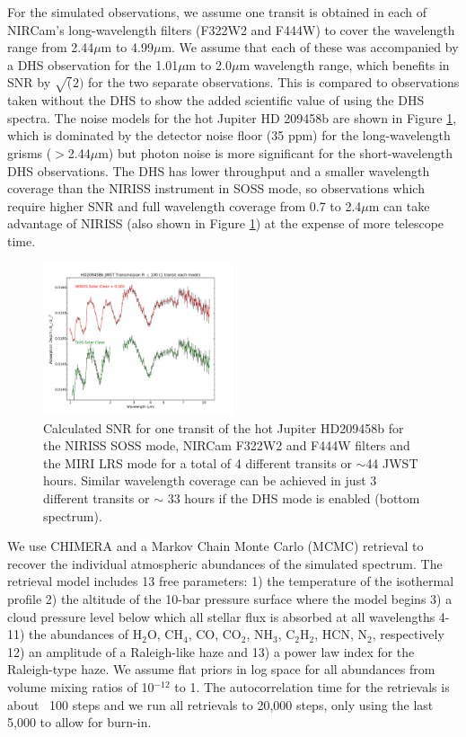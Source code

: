 \documentclass[iop]{emulateapj}
\begin{document}
For the simulated observations, we assume one transit is obtained in each of NIRCam's long-wavelength filters (F322W2 and F444W) to cover the wavelength range from 2.44$\mu$m to 4.99$\mu$m.
We assume that each of these was accompanied by a DHS observation for the 1.01$\mu$m to 2.0$\mu$m wavelength range, which benefits in SNR by $\sqrt(2)$ for the two separate observations.
This is compared to observations taken without the DHS to show the added scientific value of using the DHS spectra.
The noise models for the hot Jupiter HD 209458b are shown in Figure \ref{fig:DHSvsNIRISS209}, which is dominated by the detector noise floor (35 ppm) for the long-wavelength grisms ($>$2.44$\mu$m) but photon noise is more significant for the short-wavelength DHS observations.
The DHS has lower throughput and a smaller wavelength coverage than the NIRISS instrument in SOSS mode, so observations which require higher SNR and full wavelength coverage from 0.7 to 2.4$\mu$m can take advantage of NIRISS (also shown in Figure \ref{fig:DHSvsNIRISS209}) at the expense of more telescope time.

\begin{figure}
\centering
\includegraphics[width=0.5\textwidth]{HD209458b_solar_clear_1transit_DHS_vs_NIRISS_NIRCam_MIRILRS_R100.pdf}
\caption{Calculated SNR for one transit of the hot Jupiter HD209458b for the NIRISS SOSS mode, NIRCam F322W2 and F444W filters and the MIRI LRS mode for a total of 4 different transits or $\sim$44 JWST hours.
Similar wavelength coverage can be achieved in just 3 different transits or $\sim$ 33 hours if the DHS mode is enabled (bottom spectrum).}\label{fig:DHSvsNIRISS209}
\end{figure}

We use CHIMERA and a Markov Chain Monte Carlo (MCMC) retrieval to recover the individual atmospheric abundances of the simulated spectrum.
The retrieval model includes 13 free parameters: 1) the temperature of the isothermal profile 2) the altitude of the 10-bar pressure surface where the model begins 3) a cloud pressure level below which all stellar flux is absorbed at all wavelengths 4-11) the abundances of H$_2$O, CH$_4$, CO, CO$_2$, NH$_3$, C$_2$H$_2$, HCN, N$_2$, respectively 12) an amplitude of a Raleigh-like haze and 13) a power law index for the Raleigh-type haze.
We assume flat priors in log space for all abundances from volume mixing ratios of 10$^{-12}$ to 1.
The autocorrelation time for the retrievals is about ~100 steps and we run all retrievals to 20,000 steps, only using the last 5,000 to allow for burn-in.
\end{document}

